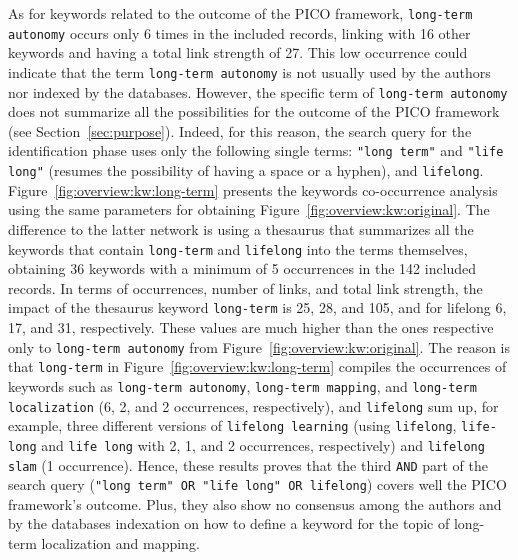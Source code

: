 As for keywords related to the outcome of the PICO framework, \texttt{long-term autonomy} occurs only 6 times in the included records, linking with 16 other keywords and having a total link strength of 27. This low occurrence could indicate that the term \texttt{long-term autonomy} is not usually used by the authors nor indexed by the databases. 
However, the specific term of \texttt{long-term autonomy} does not summarize all the possibilities for the outcome of the PICO framework (see Section~\ref{sec:purpose}). Indeed, for this reason, the search query for the identification phase uses only the following single terms: \texttt{"long term"} and \texttt{"life long"} (resumes the possibility of having a space or a hyphen), and \texttt{lifelong}.
Figure~\ref{fig:overview:kw:long-term} presents the keywords co-occurrence analysis using the same parameters for obtaining Figure~\ref{fig:overview:kw:original}. The difference to the latter network is using a thesaurus that summarizes all the keywords that contain \texttt{long-term} and \texttt{lifelong} into the terms themselves, obtaining 36 keywords with a minimum of 5 occurrences in the 142 included records.
In terms of occurrences, number of links, and total link strength, the impact of the thesaurus keyword \texttt{long-term} is 25, 28, and 105, and for lifelong 6, 17, and 31, respectively. These values are much higher than the ones respective only to \texttt{long-term autonomy} from Figure~\ref{fig:overview:kw:original}.
The reason is that \texttt{long-term} in Figure~\ref{fig:overview:kw:long-term} compiles the occurrences of keywords such as \texttt{long-term autonomy}, \texttt{long-term mapping}, and \texttt{long-term localization} (6, 2, and 2 occurrences, respectively), and \texttt{lifelong} sum up, for example, three different versions of \texttt{lifelong learning} (using \texttt{lifelong}, \texttt{life-long} and \texttt{life long} with 2, 1, and 2 occurrences, respectively) and \texttt{lifelong slam} (1 occurrence). Hence, these results proves that the third \texttt{AND} part of the search query (\texttt{"long term" OR "life long" OR lifelong}) covers well the PICO framework's outcome. Plus, they also show no consensus among the authors and by the databases indexation on how to define a keyword for the topic of long-term localization and mapping.

